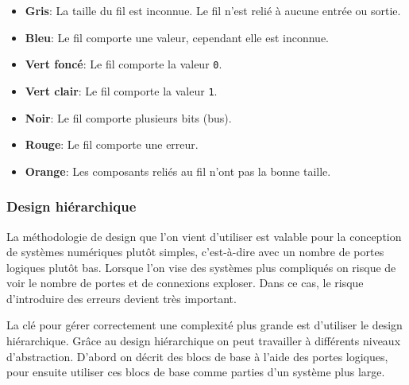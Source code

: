 \documentclass{article}
\begin{document}
\begin{enumerate}
        \begin{itemize}
            \item \textbf{Gris}: La taille du fil est inconnue.
            Le fil n'est relié à aucune entrée ou sortie.
            \item \textbf{Bleu}: Le fil comporte une valeur, cependant elle est inconnue.
            \item \textbf{Vert foncé}: Le fil comporte la valeur \texttt{0}.
            \item \textbf{Vert clair}: Le fil comporte la valeur \texttt{1}.
            \item \textbf{Noir}: Le fil comporte plusieurs bits (bus).
            \item \textbf{Rouge}: Le fil comporte une erreur.
            \item \textbf{Orange}: Les composants reliés au fil n'ont pas la bonne taille.
        \end{itemize}

    \end{enumerate}


    \subsubsection{Design hiérarchique}
    La méthodologie de design que l'on vient d'utiliser est valable pour la conception de systèmes numériques plutôt
    simples, c'est-à-dire avec un nombre de portes logiques plutôt bas.
    Lorsque l'on vise des systèmes plus compliqués on
    risque de voir le nombre de portes et de connexions exploser.
    Dans ce cas, le risque d'introduire des erreurs devient
    très important.

    La clé pour gérer correctement une complexité plus grande est d'utiliser le design hiérarchique.
    Grâce au design
    hiérarchique on peut travailler à différents niveaux d'abstraction.
    D'abord on décrit des blocs de base à l'aide des
    portes logiques, pour ensuite utiliser ces blocs de base comme parties d'un système plus large.
\end{document}
